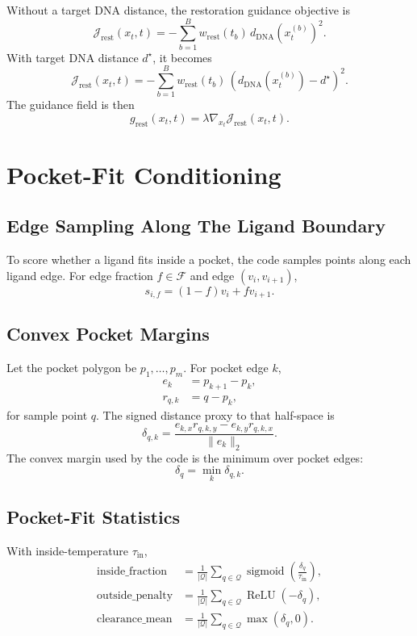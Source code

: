 \documentclass[11pt]{article}
\newcommand{\sigmoid}{\operatorname{sigmoid}}
\newcommand{\ReLU}{\operatorname{ReLU}}
\begin{document}
Without a target DNA distance, the restoration guidance objective is
\begin{equation}
\mathcal{J}_{\mathrm{rest}}(x_t,t)
=
- \sum_{b=1}^B
w_{\mathrm{rest}}(t_b)\,
d_{\mathrm{DNA}}(x_t^{(b)})^2.
\end{equation}
With target DNA distance $d^\star$, it becomes
\begin{equation}
\mathcal{J}_{\mathrm{rest}}(x_t,t)
=
- \sum_{b=1}^B
w_{\mathrm{rest}}(t_b)\,
\left(d_{\mathrm{DNA}}(x_t^{(b)}) - d^\star\right)^2.
\end{equation}
The guidance field is then
\begin{equation}
g_{\mathrm{rest}}(x_t,t) = \lambda \nabla_{x_t}\mathcal{J}_{\mathrm{rest}}(x_t,t).
\end{equation}

\section{Pocket-Fit Conditioning}
\subsection{Edge Sampling Along The Ligand Boundary}
To score whether a ligand fits inside a pocket, the code samples points along each ligand edge. For edge fraction $f \in \mathcal{F}$ and edge $(v_i,v_{i+1})$,
\begin{equation}
s_{i,f} = (1-f) v_i + f v_{i+1}.
\end{equation}

\subsection{Convex Pocket Margins}
Let the pocket polygon be $p_1,\dots,p_m$. For pocket edge $k$,
\begin{align}
e_k &= p_{k+1} - p_k, \\
r_{q,k} &= q - p_k,
\end{align}
for sample point $q$. The signed distance proxy to that half-space is
\begin{equation}
\delta_{q,k}
=
\frac{e_{k,x} r_{q,k,y} - e_{k,y} r_{q,k,x}}
{\|e_k\|_2}.
\end{equation}
The convex margin used by the code is the minimum over pocket edges:
\begin{equation}
\delta_q = \min_k \delta_{q,k}.
\end{equation}

\subsection{Pocket-Fit Statistics}
With inside-temperature $\tau_{\mathrm{in}}$,
\begin{align}
\mathrm{inside\_fraction}
&=
\frac{1}{|\mathcal{Q}|}
\sum_{q \in \mathcal{Q}}
\sigmoid\!\left(\frac{\delta_q}{\tau_{\mathrm{in}}}\right), \\
\mathrm{outside\_penalty}
&=
\frac{1}{|\mathcal{Q}|}
\sum_{q \in \mathcal{Q}} \ReLU(-\delta_q), \\
\mathrm{clearance\_mean}
&=
\frac{1}{|\mathcal{Q}|}
\sum_{q \in \mathcal{Q}} \max(\delta_q, 0).
\end{align}
\end{document}

